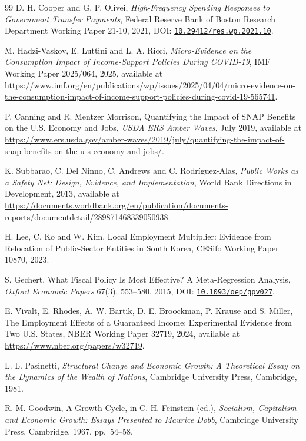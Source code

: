\documentclass[review,12pt]{elsarticle}
\theoremstyle{plain}
\theoremstyle{definition}
\theoremstyle{remark}
\begin{document}
\begin{thebibliography}{99}
 D. H. Cooper and G. P. Olivei, \emph{High-Frequency Spending Responses to Government Transfer Payments}, Federal Reserve Bank of Boston Research Department Working Paper 21-10, 2021, DOI: \href{https://doi.org/10.29412/res.wp.2021.10}{\texttt{10.29412/res.wp.2021.10}}.

 M. Hadzi-Vaskov, E. Luttini and L. A. Ricci, \emph{Micro-Evidence on the Consumption Impact of Income-Support Policies During COVID-19}, IMF Working Paper 2025/064, 2025, available at \url{https://www.imf.org/en/publications/wp/issues/2025/04/04/micro-evidence-on-the-consumption-impact-of-income-support-policies-during-covid-19-565741}.

 P. Canning and R. Mentzer Morrison, Quantifying the Impact of SNAP Benefits on the U.S. Economy and Jobs, \emph{USDA ERS Amber Waves}, July 2019, available at \url{https://www.ers.usda.gov/amber-waves/2019/july/quantifying-the-impact-of-snap-benefits-on-the-u-s-economy-and-jobs/}.

 K. Subbarao, C. Del Ninno, C. Andrews and C. Rodr\'iguez-Alas, \emph{Public Works as a Safety Net: Design, Evidence, and Implementation}, World Bank Directions in Development, 2013, available at \url{https://documents.worldbank.org/en/publication/documents-reports/documentdetail/289871468339050938}.

 H. Lee, C. Ko and W. Kim, Local Employment Multiplier: Evidence from Relocation of Public-Sector Entities in South Korea, CESifo Working Paper 10870, 2023.

 S. Gechert, What Fiscal Policy Is Most Effective? A Meta-Regression Analysis, \emph{Oxford Economic Papers} 67(3), 553--580, 2015, DOI: \href{https://doi.org/10.1093/oep/gpv027}{\texttt{10.1093/oep/gpv027}}.

 E. Vivalt, E. Rhodes, A. W. Bartik, D. E. Broockman, P. Krause and S. Miller, The Employment Effects of a Guaranteed Income: Experimental Evidence from Two U.S. States, NBER Working Paper 32719, 2024, available at \url{https://www.nber.org/papers/w32719}.

 L. L. Pasinetti, \emph{Structural Change and Economic Growth: A Theoretical Essay on the Dynamics of the Wealth of Nations}, Cambridge University Press, Cambridge, 1981.

 R. M. Goodwin, A Growth Cycle, in C. H. Feinstein (ed.), \emph{Socialism, Capitalism and Economic Growth: Essays Presented to Maurice Dobb}, Cambridge University Press, Cambridge, 1967, pp.~54--58.


\end{thebibliography}
\end{document}
